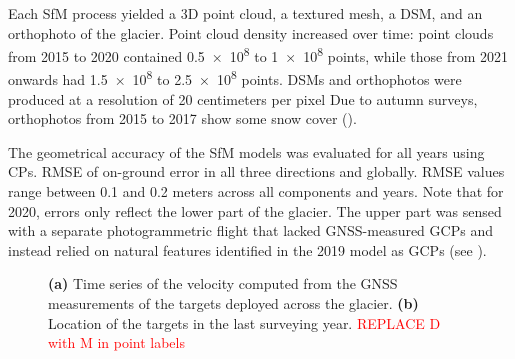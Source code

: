 Each SfM process yielded a 3D point cloud, a textured mesh, a DSM, and an orthophoto of the glacier. 
Point cloud density increased over time: point clouds from 2015 to 2020 contained \SI{0.5e8}{} to \SI{1e8}{} 
points, while those from 2021 onwards had \SI{1.5e8}{} to \SI{2.5e8}{} points. 
DSMs and orthophotos were produced at a resolution of 20 centimeters per pixel 
Due to autumn surveys, orthophotos from 2015 to 2017 show some snow cover ().

The geometrical accuracy of the SfM models was evaluated for all years using CPs.
 RMSE of on-ground error in all three directions and globally. 
RMSE values range between 0.1 and 0.2 meters across all components and years. 
Note that for 2020, errors only reflect the lower part of the glacier. 
The upper part was sensed with a separate photogrammetric flight that lacked GNSS-measured
GCPs and instead relied on natural features identified in the 2019 model as GCPs (see ).


\begin{figure}[ht!]
    \caption{\textbf{(a)} Time series of the velocity computed from the GNSS measurements of the targets deployed across the glacier. 
    \textbf{(b)} Location of the targets in the last surveying year. \textcolor{red}{REPLACE D with M in point labels}}
    \label{fig:3:GNSS_velocity}		
\end{figure}

